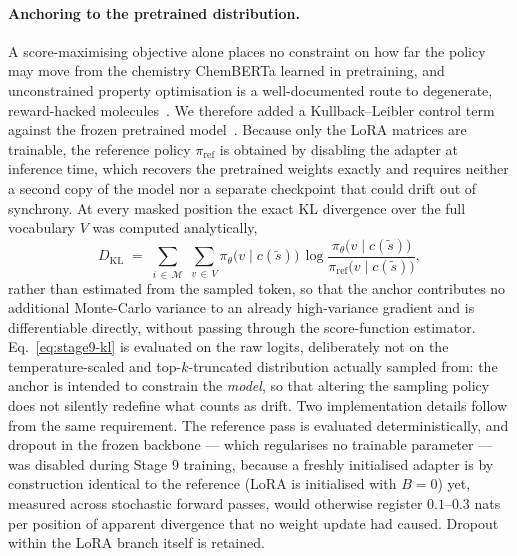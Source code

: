 \paragraph{Anchoring to the pretrained distribution.}
A score-maximising objective alone places no constraint on how far the policy
may move from the chemistry ChemBERTa learned in pretraining, and unconstrained
property optimisation is a well-documented route to degenerate, reward-hacked
molecules~\cite{renz2019failure,gao2020synthesizability}. We therefore added a
Kullback--Leibler control term against the frozen pretrained
model~\cite{jaques2017sequencetutor,ziegler2019finetuning}. Because only the
LoRA matrices are trainable, the reference policy $\pi_{\mathrm{ref}}$ is
obtained by disabling the adapter at inference time, which recovers the
pretrained weights exactly and requires neither a second copy of the model nor
a separate checkpoint that could drift out of synchrony. At every masked
position the exact KL divergence over the full vocabulary $V$ was computed
analytically,
\begin{equation}
D_{\mathrm{KL}} \;=\; \sum_{i \,\in\, \mathcal{M}} \; \sum_{v \,\in\, V} \pi_{\theta}\bigl(v \mid c(\tilde{s})\bigr) \, \log \frac{\pi_{\theta}\bigl(v \mid c(\tilde{s})\bigr)}{\pi_{\mathrm{ref}}\bigl(v \mid c(\tilde{s})\bigr)},
\label{eq:stage9-kl}
\end{equation}
rather than estimated from the sampled token, so that the anchor contributes
no additional Monte-Carlo variance to an already high-variance gradient and is
differentiable directly, without passing through the score-function estimator.
Eq.~\eqref{eq:stage9-kl} is evaluated on the raw logits, deliberately not on
the temperature-scaled and top-$k$-truncated distribution actually sampled
from: the anchor is intended to constrain the \emph{model}, so that altering
the sampling policy does not silently redefine what counts as drift. Two
implementation details follow from the same requirement. The reference pass is
evaluated deterministically, and dropout in the frozen backbone --- which
regularises no trainable parameter --- was disabled during Stage 9 training,
because a freshly initialised adapter is by construction identical to the
reference (LoRA is initialised with $B=0$) yet, measured across stochastic
forward passes, would otherwise register $0.1$--$0.3$ nats per position of
apparent divergence that no weight update had caused. Dropout within the LoRA
branch itself is retained.

